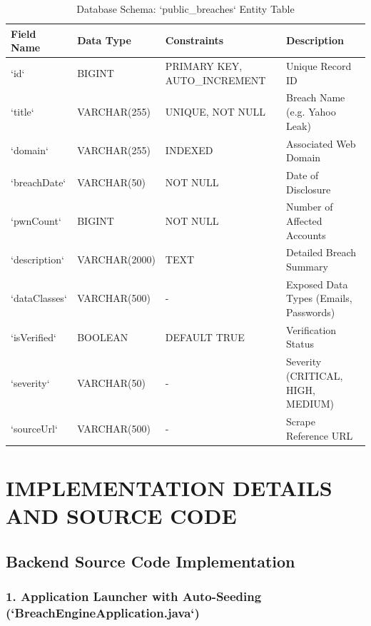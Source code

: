 \documentclass[12pt,a4paper,oneside]{report}
\begin{document}
\begin{table}[H]
\centering
\caption{Database Schema: `public_breaches` Entity Table}
\begin{tabular}{@{}llll@{}}
\toprule
Field Name & Data Type & Constraints & Description \\ \midrule
`id` & BIGINT & PRIMARY KEY, AUTO\_INCREMENT & Unique Record ID \\
`title` & VARCHAR(255) & UNIQUE, NOT NULL & Breach Name (e.g. Yahoo Leak) \\
`domain` & VARCHAR(255) & INDEXED & Associated Web Domain \\
`breachDate` & VARCHAR(50) & NOT NULL & Date of Disclosure \\
`pwnCount` & BIGINT & NOT NULL & Number of Affected Accounts \\
`description` & VARCHAR(2000) & TEXT & Detailed Breach Summary \\
`dataClasses` & VARCHAR(500) & - & Exposed Data Types (Emails, Passwords) \\
`isVerified` & BOOLEAN & DEFAULT TRUE & Verification Status \\
`severity` & VARCHAR(50) & - & Severity (CRITICAL, HIGH, MEDIUM) \\
`sourceUrl` & VARCHAR(500) & - & Scrape Reference URL \\
\bottomrule
\end{tabular}
\end{table}

\clearpage

\chapter{IMPLEMENTATION DETAILS AND SOURCE CODE}

\section{Backend Source Code Implementation}

\subsection{1. Application Launcher with Auto-Seeding (`BreachEngineApplication.java`)}
\end{document}
